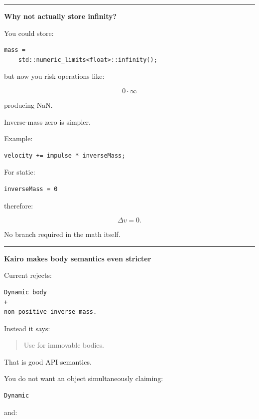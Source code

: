 \begin{center}\rule{0.5\linewidth}{0.5pt}\end{center}

\textbf{Why not actually store infinity?}

You could store:

\begin{verbatim}
mass =
    std::numeric_limits<float>::infinity();
\end{verbatim}

but now you risk operations like:

\[
0\cdot\infty
\]

producing NaN.

Inverse-mass zero is simpler.

Example:

\begin{verbatim}
velocity += impulse * inverseMass;
\end{verbatim}

For static:

\begin{verbatim}
inverseMass = 0
\end{verbatim}

therefore:

\[
\Delta v=0.
\]

No branch required in the math itself.

\begin{center}\rule{0.5\linewidth}{0.5pt}\end{center}

\textbf{Kairo makes body semantics even stricter}

Current  rejects:

\begin{verbatim}
Dynamic body
+
non-positive inverse mass.
\end{verbatim}

Instead it says:

\begin{quote}
Use  for immovable bodies.
\end{quote}

That is good API semantics.

You do not want an object simultaneously claiming:

\begin{verbatim}
Dynamic
\end{verbatim}

and:

